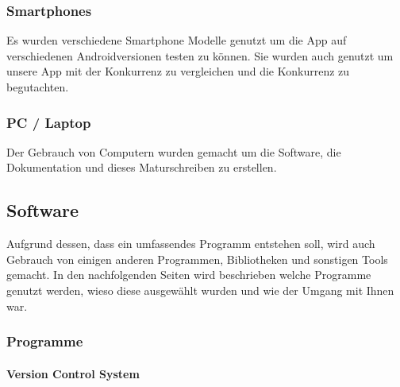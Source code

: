 \documentclass[a4paper,11pt]{article}
\begin{document}
\subsubsection{Smartphones}

Es wurden verschiedene Smartphone Modelle genutzt um die App auf verschiedenen Androidversionen testen zu können. Sie wurden auch genutzt um unsere App mit der Konkurrenz zu vergleichen und die 
Konkurrenz zu begutachten. 

\subsubsection{PC / Laptop}

Der Gebrauch von Computern wurden gemacht um die Software, die Dokumentation und dieses Maturschreiben zu erstellen. 
\subsection{Software}

Aufgrund dessen, dass ein umfassendes Programm entstehen soll, wird auch Gebrauch von einigen anderen Programmen, Bibliotheken und sonstigen Tools gemacht. In den nachfolgenden Seiten wird beschrieben welche Programme genutzt werden, wieso diese ausgewählt wurden und wie der Umgang mit Ihnen war.  


\subsubsection{Programme}

\paragraph{Version Control System}
\end{document}
